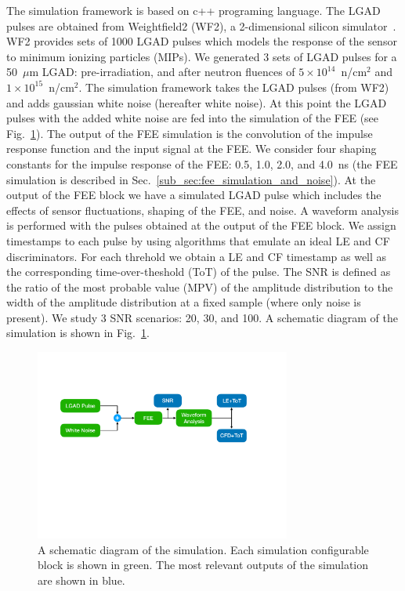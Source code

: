 \documentclass[preprint,1p]{elsarticle}
\begin{document}
The simulation framework is based on c++ programing language. The LGAD pulses are obtained
from Weightfield2 (WF2), a 2-dimensional silicon simulator~\cite{Sadrozinski:2017qpv}. WF2 provides sets of 1000 LGAD pulses which models the response
of the sensor to minimum ionizing particles (MIPs). We generated 3 sets of LGAD pulses for a 50~$\mu$m LGAD:
 pre-irradiation, and after neutron fluences of $5\times 10^{14}$~n/cm$^2$ and $1\times 10^{15}$~n/cm$^2$. The simulation framework
 takes the LGAD pulses (from WF2) and adds gaussian white noise (hereafter white noise). At this point the LGAD pulses with the added white noise
 are fed into the simulation of the FEE (see Fig.~\ref{fig:simulation_diagram}). The output of the FEE simulation is the convolution of the
 impulse response function and the input signal at the FEE. We consider four shaping constants for the impulse response
 of the FEE: 0.5, 1.0, 2.0, and 4.0~\si{ns} (the FEE simulation is described
  in Sec.~\ref{sub_sec:fee_simulation_and_noise}). At the output of the FEE block we have a simulated LGAD pulse which includes the effects
 of sensor fluctuations, shaping of the FEE, and noise. A waveform analysis is performed
  with the pulses obtained at the output of the FEE block. We assign timestamps to each pulse by using algorithms that emulate
  an ideal LE and CF discriminators. For each threhold we obtain a LE and CF
  timestamp as well as the corresponding time-over-theshold (ToT) of the pulse.
  The SNR is defined as the ratio of the most probable value (MPV) of the amplitude distribution to the
  width of the amplitude distribution at a fixed sample (where only noise is present). We study 3 SNR scenarios: 20, 30, and 100.
  A schematic diagram of the simulation is shown in Fig.~\ref{fig:simulation_diagram}.

\begin{figure}[htbp]
\centering
\includegraphics[width=0.75\textwidth]{figs/lgad_simulation_diagram.pdf}
\caption{A schematic diagram of the simulation. Each simulation configurable block is shown in green. The most relevant outputs
of the simulation are shown in blue.}
\label{fig:simulation_diagram}
\end{figure}
\end{document}
